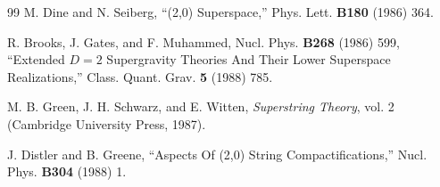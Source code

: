 \begin{thebibliography}{99}
 M. Dine and N. Seiberg, ``(2,0) Superspace,'' Phys. Lett. \textbf{B180} (1986) 364.

 R. Brooks, J. Gates, and F. Muhammed, Nucl. Phys. \textbf{B268} (1986) 599, ``Extended $D=2$ Supergravity Theories And Their Lower Superspace Realizations,'' Class. Quant. Grav. \textbf{5} (1988) 785.

 M. B. Green, J. H. Schwarz, and E. Witten, \textit{Superstring Theory}, vol. 2 (Cambridge University Press, 1987).

\label{op:92}
 J. Distler and B. Greene, ``Aspects Of (2,0) String Compactifications,'' Nucl. Phys. \textbf{B304} (1988) 1.

\end{thebibliography}
